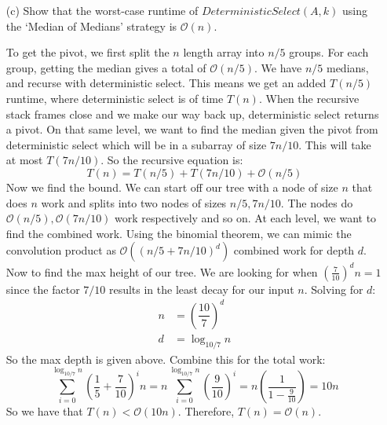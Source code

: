 \documentclass{article}
\begin{document}
\begin{itemize}
    \item [(c)] Show that the worst-case runtime of $DeterministicSelect(A, k)$ using the ‘Median of Medians’ strategy is $\mathcal{O}(n)$.
        \begin{answer}
            To get the pivot, we first split the $n$ length array into $n / 5$ groups. For each group, getting the median gives a total of $\mathcal{O}(n / 5)$. We have $n / 5$ medians, and recurse with deterministic select. This means we get an added $T(n / 5)$ runtime, where deterministic select is of time $T(n)$. When the recursive stack frames close and we make our way back up, deterministic select returns a pivot. On that same level, we want to find the median given the pivot from deterministic select which will be in a subarray of size $7n / 10$. This will take at most $T(7n / 10)$. So the recursive equation is:
                \begin{equation*}
                    T(n) = T(n / 5) + T(7n / 10) + \mathcal{O}(n / 5)
                \end{equation*}
            Now we find the bound. We can start off our tree with a node of size $n$ that does $n$ work and splits into two nodes of sizes $n / 5, 7n / 10$. The nodes do $\mathcal{O}(n / 5), \mathcal{O}(7n / 10)$ work respectively and so on. At each level, we want to find the combined work. Using the binomial theorem, we can mimic the convolution product as $\mathcal{O}((n / 5 + 7n / 10)^{d})$ combined work for depth $d$. Now to find the max height of our tree. We are looking for when $(\frac{7}{10})^{d}n = 1$ since the factor $7/10$ results in the least decay for our input $n$. Solving for $d$:
                \begin{align*}
                    n &= \left(\dfrac{10}{7}\right)^{d} \\
                    d &= \log_{10  / 7}{n}                
                \end{align*}
            So the max depth is given above. Combine this for the total work:
                \begin{equation*}
                    \sum_{i = 0}^{\log_{10 / 7}n} \left(\dfrac{1}{5} + \dfrac{7}{10}\right)^{i}n = n \sum_{i = 0}^{\log_{10 / 7}n} \left(\dfrac{9}{10}\right)^{i} = n\left(\dfrac{1}{1 - \frac{9}{10}}\right) = 10n
                \end{equation*}
            So we have that $T(n) < \mathcal{O}(10n)$. Therefore, $T(n) = \mathcal{O}(n)$.
        \end{answer}

\end{itemize}
\end{document}
